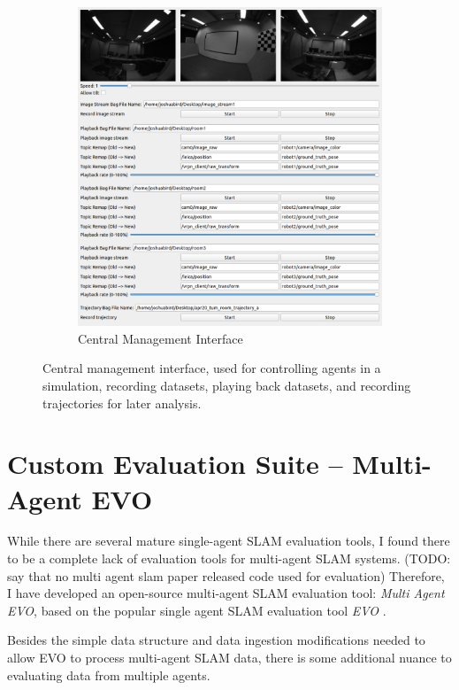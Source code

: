 \begin{figure}[h]
\begin{subfigure}[c]{0.55\textwidth}
        \includegraphics[width=\linewidth]{figures/central_management_interface.png}
        \caption{Central Management Interface}
    \end{subfigure}%

    \caption{Central management interface, used for controlling agents in a simulation, recording datasets, playing back datasets, and recording trajectories for later analysis.}
    \label{fig:central-management-interface}
\end{figure}

\section{Custom Evaluation Suite – Multi-Agent EVO}
\label{sec:multi-agent-evo}
While there are several mature single-agent SLAM evaluation tools, I found there to be a complete lack of evaluation tools for multi-agent SLAM systems. (TODO: say that no multi agent slam paper released code used for evaluation) Therefore, I have developed an open-source multi-agent SLAM evaluation tool: \textit{Multi Agent EVO}, based on the popular single agent SLAM evaluation tool \textit{EVO} \autocite{grupp2017evo}.

Besides the simple data structure and data ingestion modifications needed to allow EVO to process multi-agent SLAM data, there is some additional nuance to evaluating data from multiple agents.


